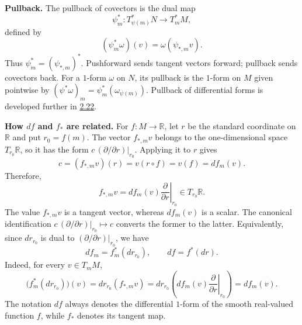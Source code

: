 \medskip\noindent\textbf{Pullback.}
The pullback of covectors is the dual map
\begin{equation}
  \tag{5}\label{eq:1.22:5}
  \psi_m^*:T_{\psi(m)}^*N\longrightarrow T_m^*M,
\end{equation}
defined by
\begin{equation}
  \tag{6}\label{eq:1.22:6}
  (\psi_m^*\omega)(v)=\omega(\psi_{*,m}v).
\end{equation}
Thus $\psi_m^*=(\psi_{*,m})^*$. Pushforward sends tangent vectors
forward; pullback sends covectors back. For a $1$-form $\omega$ on $N$,
its pullback is the $1$-form on $M$ given pointwise by
$(\psi^*\omega)_m=\psi_m^*(\omega_{\psi(m)})$.
Pullback of differential forms is developed further in
\hyperref[thm:2.22]{2.22}.

\medskip\noindent\textbf{How $df$ and $f_*$ are related.}
For $f:M\to\mathbb R$, let $r$ be the standard coordinate on
$\mathbb R$ and put $r_0=f(m)$. The vector $f_{*,m}v$ belongs to the
one-dimensional space $T_{r_0}\mathbb R$, so it has the form
$c\,(\partial/\partial r)|_{r_0}$. Applying it to $r$ gives
\[
  c=(f_{*,m}v)(r)=v(r\circ f)=v(f)=df_m(v).
\]
Therefore,
\begin{equation}
  \tag{7}\label{eq:1.22:7}
  f_{*,m}v=df_m(v)\left.\frac{\partial}{\partial r}\right|_{r_0}
  \in T_{r_0}\mathbb R.
\end{equation}
The value $f_{*,m}v$ is a tangent vector, whereas $df_m(v)$ is a scalar.
The canonical identification
$c\,(\partial/\partial r)|_{r_0}\mapsto c$ converts the former to the latter.
Equivalently, since $dr_{r_0}$ is dual to
$(\partial/\partial r)|_{r_0}$, we have
\begin{equation}
  \tag{8}\label{eq:1.22:8}
  df_m=f_m^*(dr_{r_0}),\qquad df=f^*(dr).
\end{equation}
Indeed, for every $v\in T_mM$,
\[
  \bigl(f_m^*(dr_{r_0})\bigr)(v)
  =dr_{r_0}(f_{*,m}v)
  =dr_{r_0}\!\left(df_m(v)\left.\frac{\partial}{\partial r}\right|_{r_0}\right)
  =df_m(v).
\]
The notation $df$ always denotes the differential $1$-form of the
smooth real-valued function $f$, while $f_*$ denotes its tangent map.

